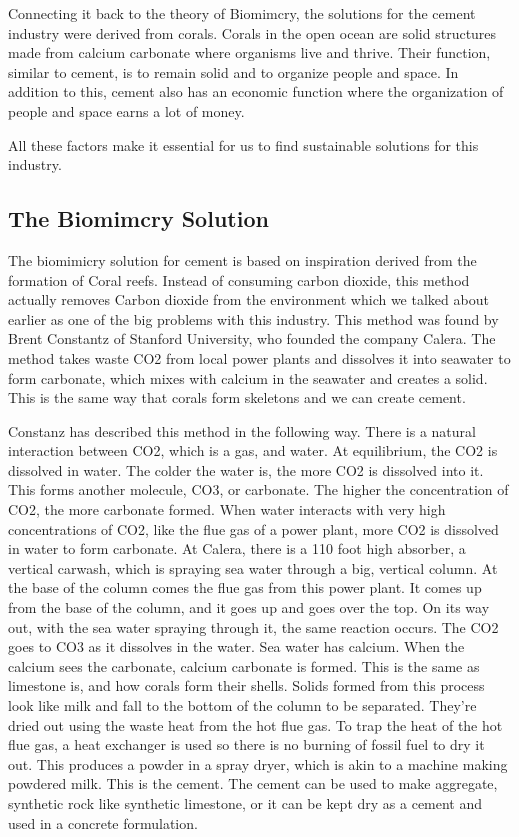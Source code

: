 Connecting it back to the theory of Biomimcry, the solutions for the cement industry were derived from corals. Corals in the open ocean are solid structures made from calcium carbonate where organisms live and thrive. Their function, similar to cement, is to remain solid and to organize people and space. In addition to this, cement also has an economic function where the organization of people and space earns a lot of money.

All these factors make it essential for us to find sustainable solutions for this industry.

\subsection{The Biomimcry Solution}

The biomimicry solution for cement is based on inspiration derived from the formation of Coral reefs. Instead of consuming carbon dioxide, this method actually removes Carbon dioxide from the environment which we talked about earlier as one of the big problems with this industry. This method was found by Brent Constantz of Stanford University, who founded the company Calera. The method takes waste CO2 from local power plants and dissolves it into seawater to form carbonate, which mixes with calcium in the seawater and creates a solid.  This is the same way that corals form skeletons and we can create cement.

Constanz has described this method in the following way. There is a natural interaction between CO2, which is a gas, and water. At equilibrium, the CO2 is dissolved in water. The colder the water is, the more CO2 is dissolved into it. This forms another molecule, CO3, or carbonate. The higher the concentration of CO2, the more carbonate formed. When water interacts with very high concentrations of CO2, like the flue gas of a power plant, more CO2 is dissolved in water to form carbonate. 
At Calera, there is a 110 foot high absorber, a vertical carwash, which is spraying sea water through a big, vertical column. At the base of the column comes the flue gas from this power plant. It comes up from the base of the column, and it goes up and goes over the top. On its way out, with the sea water spraying through it, the same reaction occurs. The CO2 goes to CO3 as it dissolves in the water.
Sea water has calcium. When the calcium sees the carbonate, calcium carbonate is formed. This is the same as limestone is, and how corals form their shells. Solids formed from this process look like milk and fall to the bottom of the column to be separated. They're dried out using the waste heat from the hot flue gas. To trap the heat of the hot flue gas, a heat exchanger is used so there is no burning of fossil fuel to dry it out. This produces a powder in a spray dryer, which is akin to a machine making powdered milk. This is the cement. The cement can be used to make aggregate, synthetic rock like synthetic limestone, or it can be kept dry as a cement and used in a concrete formulation.

